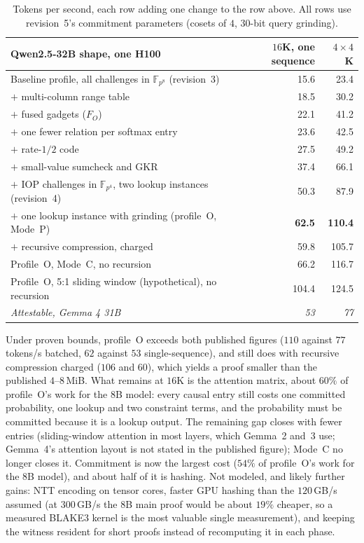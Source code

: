 \documentclass[11pt]{article}
\newcommand{\F}{\mathbb{F}}
\newcommand{\Fq}{\F_{p^4}}
\newcommand{\Fo}{\F_{p^8}}
\begin{document}
\begin{table}[h]
\centering\small
\begin{tabular}{@{}lrr@{}}
\toprule
Qwen2.5-32B shape, one H100 & \(16\)K, one sequence & \(4\times 4\)K \\
\midrule
Baseline profile, all challenges in \(\Fo\) (revision~3) & 15.6 & 23.4 \\
\(+\) multi-column range table & 18.5 & 30.2 \\
\(+\) fused gadgets (\(F_O\)) & 22.1 & 41.2 \\
\(+\) one fewer relation per softmax entry & 23.6 & 42.5 \\
\(+\) rate-\(1/2\) code & 27.5 & 49.2 \\
\(+\) small-value sumcheck and GKR & 37.4 & 66.1 \\
\(+\) IOP challenges in \(\Fq\), two lookup instances (revision~4) & 50.3 & 87.9 \\
\(+\) one lookup instance with grinding (profile~O, Mode~P) & \textbf{62.5} & \textbf{110.4} \\
\(+\) recursive compression, charged & 59.8 & 105.7 \\
\midrule
Profile~O, Mode~C, no recursion & 66.2 & 116.7 \\
Profile~O, 5:1 sliding window (hypothetical), no recursion & 104.4 & 124.5 \\
\emph{Attestable, Gemma 4 31B \cite{attestable}} & \emph{53} & \emph{77} \\
\bottomrule
\end{tabular}
\caption{Tokens per second, each row adding one change to the row above. All rows use revision~5's commitment parameters (cosets of \(4\), \(30\)-bit query grinding).}
\label{tab:ladder}
\end{table}

Under proven bounds, profile~O exceeds both published figures (\(110\) against \(77\) tokens/s batched, \(62\) against \(53\) single-sequence), and still does with recursive compression charged (\(106\) and \(60\)), which yields a proof smaller than the published \(4\)--\(8\)\,MiB.
What remains at \(16\)K is the attention matrix, about \(60\%\) of profile~O's work for the 8B model: every causal entry still costs one committed probability, one lookup and two constraint terms, and the probability must be committed because it is a lookup output.
The remaining gap closes with fewer entries (sliding-window attention in most layers, which Gemma~2 and~3 use; Gemma~4's attention layout is not stated in the published figure); Mode~C no longer closes it.
Commitment is now the largest cost (\(54\%\) of profile~O's work for the 8B model), and about half of it is hashing.
Not modeled, and likely further gains: NTT encoding on tensor cores, faster GPU hashing than the \(120\)\,GB/s assumed (at \(300\)\,GB/s the 8B main proof would be about \(19\%\) cheaper, so a measured BLAKE3 kernel is the most valuable single measurement), and keeping the witness resident for short proofs instead of recomputing it in each phase.
\end{document}
